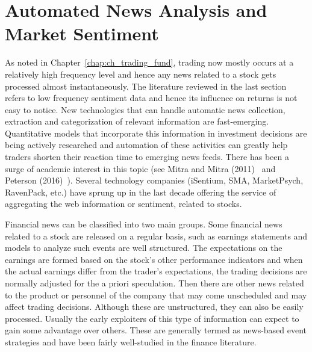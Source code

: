 \section{Automated News Analysis and Market Sentiment}\label{in:sentag1}


As noted in Chapter~\ref{chap:ch_trading_fund}, trading now mostly occurs at a relatively high frequency level and hence any news related to a stock gets processed almost instantaneously. The literature reviewed in the last section refers to low frequency sentiment data and hence its influence on returns is not easy to notice. New technologies that can handle automatic news collection, extraction and categorization of relevant information are fast-emerging. Quantitative models that incorporate this information in investment decisions are being actively researched and automation of these activities can greatly help traders shorten their reaction time to emerging news feeds. There has been a surge of academic interest in this topic (see Mitra and Mitra (2011)~\cite{mitra2} and Peterson (2016)~\cite{peterson}). Several technology companies (iSentium, SMA, MarketPsych, RavenPack, etc.) have sprung up in the last decade offering the service of aggregating the web information or sentiment, related to stocks. 


Financial news can be classified into two main groups. Some financial news related to a stock are released on a regular basis, such as earnings statements and models to analyze such events are well structured. The expectations on the earnings are formed based on the stock's other performance indicators and when the actual earnings differ from the trader's expectations, the trading decisions are normally adjusted for the a priori speculation. Then there are other news related to the product or personnel of the company that may come unscheduled and may affect trading decisions. Although these are unstructured, they can also be easily processed. Usually the early exploiters of this type of information can expect to gain some advantage over others. These are generally termed as news-based event strategies and have been fairly well-studied in the finance literature. 


